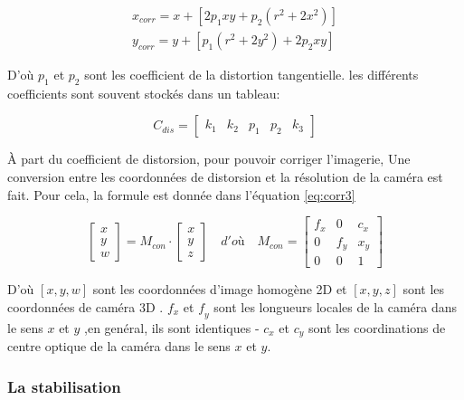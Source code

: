 \documentclass[
]{article}
\begin{document}
\begin{equation}
\begin{aligned}
   x_{corr} = x+\left[ 2 p_1 x y+ p_2\left( r^2+2x^2\right) \right]\\
  y_{corr} = y+\left[ p_1 \left(r^2+2 y^2\right)+ 2p_2xy\right]
\end{aligned}
 \label{eq:corr2}
\end{equation}

D'où \(𝑝_1\) et \(𝑝_2\) sont les coefficient de la distortion tangentielle. les différents coefficients sont souvent stockés dans un tableau:

\begin{equation}
C_{dis}=
\begin{bmatrix}
k_1 & k_2 & p_1 & p_2 & k_3
\end{bmatrix}
\end{equation}

À part du coefficient de distorsion, pour pouvoir corriger l'imagerie, Une conversion entre les coordonnées de distorsion et la résolution de la caméra est
fait. Pour cela, la formule est donnée dans l'équation \eqref{eq:corr3}

\begin{equation}
\begin{bmatrix}
x\\
y\\
w
\end{bmatrix}
= M_{con} \cdot
\begin{bmatrix}
x\\
y\\
z
\end{bmatrix}
\quad d'où \quad
M_{con} =
\begin{bmatrix}
f_x & 0 & c_x\\
0 & f_y & x_y\\
0 & 0 &1
\end{bmatrix}
\label{eq:corr3}
\end{equation}

D'où \([𝑥, 𝑦, 𝑤]\) sont les coordonnées d'image homogène 2D et \([x, y , z]\) sont les coordonnées de caméra 3D . \(f_𝑥\) et \(𝑓_𝑦\) sont les longueurs locales de la caméra dans le sens \(𝑥\) et \(𝑦\) ,en genéral, ils sont identiques - \(𝑐_𝑥\) et \(𝑐_𝑦\) sont les coordinations de centre optique de la caméra dans le sens \(𝑥\) et \(𝑦\).

\hypertarget{la-stabilisation}{%
\subsubsection*{La stabilisation}\label{la-stabilisation}}
\end{document}
